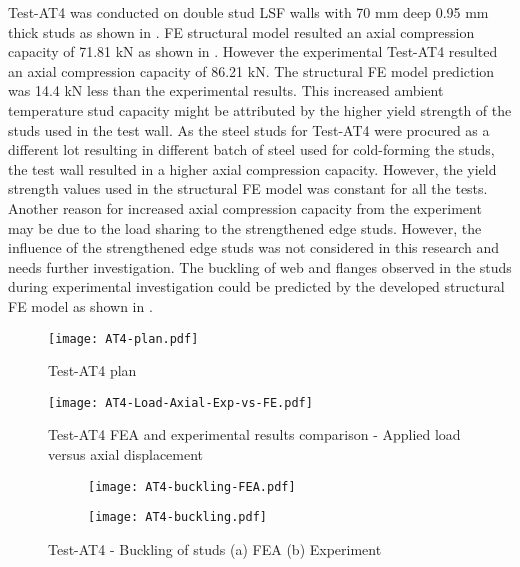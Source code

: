 Test-AT4 was conducted on double stud LSF walls with 70 mm deep 0.95 mm thick studs as shown in . FE structural model resulted an axial compression capacity of 71.81 kN as shown in . However the experimental Test-AT4 resulted an axial compression capacity of 86.21 kN. The structural FE model prediction was 14.4 kN less than the experimental results. This increased ambient temperature stud capacity might be attributed by the higher yield strength of the studs used in the test wall. As the steel studs for Test-AT4 were procured as a different lot resulting in different batch of steel used for cold-forming the studs, the test wall resulted in a higher axial compression capacity. However, the yield strength values used in the structural FE model was constant for all the tests. Another reason for increased axial compression capacity from the experiment may be due to the load sharing to the strengthened edge studs. However, the influence of the strengthened edge studs was not considered in this research and needs further investigation. The buckling of web and flanges observed in the studs during experimental investigation could be predicted by the developed structural FE model as shown in .
\begin{figure}[!htbp]
	\centering
			\texttt{[image: AT4-plan.pdf]}\\
		\caption{Test-AT4 plan}
		\label{fig:AT4-plan-fea}
\end{figure}
\begin{figure}[!htbp]
	\centering
			\texttt{[image: AT4-Load-Axial-Exp-vs-FE.pdf]}\\
		\caption{Test-AT4 FEA and experimental results comparison - Applied load versus axial displacement}
		\label{fig:AT4-fea}
\end{figure}
\begin{figure}[!htbp]
	\centering
	\begin{subfigure}[b]{0.35\textwidth}
		\centering
		\texttt{[image: AT4-buckling-FEA.pdf]}
		\caption{}
		\label{subfig:AT4-buckling-FEA}
	\end{subfigure}
	\begin{subfigure}[b]{0.35\textwidth}
		\centering
		\texttt{[image: AT4-buckling.pdf]}
		\caption{}
		\label{subfig:AT4-buckling-experiment}
	\end{subfigure}
	   \caption{Test-AT4 - Buckling of studs (a) FEA (b) Experiment}
	   \label{fig:AT4-buckling-fea-comparison}
\end{figure} 

